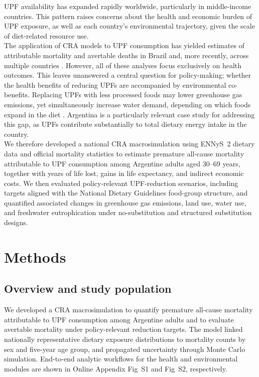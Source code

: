 \documentclass{article}
\begin{document}
UPF availability has expanded rapidly worldwide, particularly in middle-income countries.\cite{PAHO2015} This pattern raises concerns about the health and economic burden of UPF exposure, as well as each country's environmental trajectory, given the scale of diet-related resource use.\\

The application of CRA models to UPF consumption has yielded estimates of attributable mortality and avertable deaths in Brazil \citep{Nilson2023} and, more recently, across multiple countries \citep{Nilson2025}. However, all of these analyses focus exclusively on health outcomes. This leaves unanswered a central question for policy-making; whether the health benefits of reducing UPFs are accompanied by environmental co-benefits. Replacing UPFs with less processed foods may lower greenhouse gas emissions, yet simultaneously increase water demand, depending on which foods expand in the diet \citep{Anastasiou2022JCP,Garzillo2022RSP,Arrieta2022SustainSci}. Argentina is a particularly relevant case study for addressing this gap, as UPFs contribute substantially to total dietary energy intake in the country.\citep{Zapata2023} \\

We therefore developed a national CRA macrosimulation using ENNyS~2 dietary data and official mortality statistics to estimate premature all-cause mortality attributable to UPF consumption among Argentine adults aged 30–69 years, together with years of life lost, gains in life expectancy, and indirect economic costs. We then evaluated policy-relevant UPF-reduction scenarios, including targets aligned with the National Dietary Guidelines food-group structure,\citep{NDG2016} and quantified associated changes in greenhouse gas emissions, land use, water use, and freshwater eutrophication under no-substitution and structured substitution designs. 

\section{Methods}\label{methods}

\subsection{Overview and study population}

We developed a CRA macrosimulation\cite{Murray2003,WHO2004CQR,Forouzanfar2015} to quantify premature all-cause mortality attributable to UPF consumption among Argentine adults and to evaluate avertable mortality under policy-relevant reduction targets. The model linked nationally representative dietary exposure distributions to mortality counts by sex and five-year age group, and propagated uncertainty through Monte Carlo simulation. End-to-end analytic workflows for the health and environmental modules are shown in Online Appendix Fig~S1 and Fig~S2, respectively. \\
\end{document}
